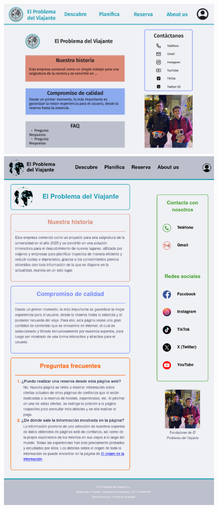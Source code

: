 \documentclass[11pt, a4paper]{book}
\begin{document}
	\begin{figure} [H]
		\centering
		\begin{minipage}[c]{0.45\textwidth}
			\centering
			\includegraphics[width=\textwidth]{mockup-about_us.png}
		\end{minipage}
		\hspace{0.04\textwidth}
		\begin{minipage}[c]{0.45\textwidth}
			\centering
			\includegraphics[width=\textwidth]{full-5.png}

\end{minipage}
\end{figure}
\end{document}
